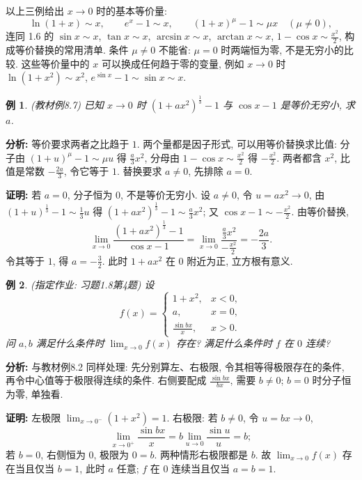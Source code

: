 \documentclass[UTF8,openany]{ctexbook}
\theoremstyle{chinesetextbook}
\newtheorem{example}{例}[section]
\newenvironment{cnproof}{\par\indent\textbf{证明:} \ignorespaces}{\par}
\begin{document}
以上三例给出 $x\to0$ 时的基本等价量:
\[
\ln(1+x)\sim x,\qquad e^x-1\sim x,\qquad
(1+x)^\mu-1\sim\mu x\quad(\mu\ne0),
\]
连同 1.6 的 $\sin x\sim x$, $\tan x\sim x$, $\arcsin x\sim x$, $\arctan x\sim x$, $\displaystyle1-\cos x\sim\frac{x^2}2$, 构成等价替换的常用清单. 条件 $\mu\ne0$ 不能省: $\mu=0$ 时两端恒为零, 不是无穷小的比较. 这些等价量中的 $x$ 可以换成任何趋于零的变量, 例如 $x\to0$ 时 $\ln(1+x^2)\sim x^2$, $e^{\sin x}-1\sim\sin x\sim x$.
\begin{example}
\textnormal{(教材例8.7)} 已知 $x\to0$ 时 $(1+ax^2)^{\frac13}-1$ 与 $\cos x-1$ 是等价无穷小, 求 $a$.
\end{example}
\par\indent\textbf{分析:} 等价要求两者之比趋于 $1$. 两个量都是因子形式, 可以用等价替换求比值: 分子由 $(1+u)^\mu-1\sim\mu u$ 得 $\displaystyle\frac a3x^2$, 分母由 $\displaystyle1-\cos x\sim\frac{x^2}2$ 得 $\displaystyle-\frac{x^2}2$. 两者都含 $x^2$, 比值是常数 $\displaystyle-\frac{2a}3$, 令它等于 $1$. 替换要求 $a\ne0$, 先排除 $a=0$.
\begin{cnproof}
若 $a=0$, 分子恒为 $0$, 不是等价无穷小. 设 $a\ne0$, 令 $u=ax^2\to0$, 由 $(1+u)^{\frac13}-1\sim\frac13u$ 得 $\displaystyle(1+ax^2)^{\frac13}-1\sim\frac a3x^2$; 又 $\displaystyle\cos x-1\sim-\frac{x^2}2$. 由等价替换,
\[
\lim_{x\to0}\frac{(1+ax^2)^{\frac13}-1}{\cos x-1}
=\lim_{x\to0}\frac{\frac a3x^2}{-\frac{x^2}2}=-\frac{2a}3.
\]
令其等于 $1$, 得 $\displaystyle a=-\frac32$. 此时 $1+ax^2$ 在 $0$ 附近为正, 立方根有意义.
\end{cnproof}
\begin{example}
\textnormal{(指定作业: 习题1.8第4题)} 设
\[
f(x)=\begin{cases}1+x^2,&x<0,\\a,&x=0,\\\frac{\sin bx}{x},&x>0.\end{cases}
\]
问 $a,b$ 满足什么条件时 $\displaystyle\lim_{x\to0}f(x)$ 存在? 满足什么条件时 $f$ 在 $0$ 连续?
\end{example}
\par\indent\textbf{分析:} 与教材例8.2 同样处理: 先分别算左、右极限, 令其相等得极限存在的条件, 再令中心值等于极限得连续的条件. 右侧要配成 $\displaystyle\frac{\sin bx}{bx}$, 需要 $b\ne0$; $b=0$ 时分子恒为零, 单独看.
\begin{cnproof}
左极限 $\displaystyle\lim_{x\to0^-}(1+x^2)=1$. 右极限: 若 $b\ne0$, 令 $u=bx\to0$,
\[
\lim_{x\to0^+}\frac{\sin bx}x=b\lim_{u\to0}\frac{\sin u}u=b;
\]
若 $b=0$, 右侧恒为 $0$, 极限为 $0=b$. 两种情形右极限都是 $b$. 故 $\displaystyle\lim_{x\to0}f(x)$ 存在当且仅当 $b=1$, 此时 $a$ 任意; $f$ 在 $0$ 连续当且仅当 $a=b=1$.
\end{cnproof}
\end{document}

